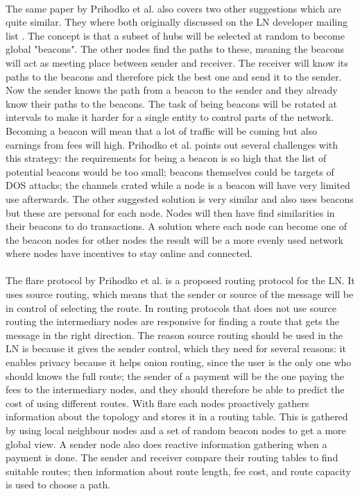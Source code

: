 \documentclass[informationsecurity]{gucmasterproject}
\begin{document}
\paragraph{}
The  same paper by Prihodko et al.\cite{prihodko2016flare} also covers two other suggestions which are quite similar.
They where both originally discussed on the LN developer mailing list\cite{rusty_routing1} \cite{rusty_routing2} \cite{rusty_routing3}. The concept is that a subset of hubs will be selected at random to become global "beacons". The other nodes find the paths to these, meaning the beacons will act as meeting place between sender and receiver. The receiver will know its paths to the beacons and therefore pick the best one and send it to the sender. Now the sender knows the path from a beacon to the sender and they already know their paths to the beacons. The task of being beacons will be rotated at intervals to make it harder for a single entity to control parts of the network. Becoming a beacon will mean that a lot of traffic will be coming but also earnings from fees will high.
Prihodko et al. points out several challenges with this strategy: the requirements for being a beacon is so high that the list of potential beacons would be too small; beacons themselves could be targets of DOS attacks; the channels crated while a node is a beacon will have very limited use afterwards. The other suggested solution is very similar and also uses beacons but these are personal for each node. Nodes will then have find similarities in their beacons to do transactions. A solution where each node can become one of the beacon nodes for other nodes the result will be a more evenly used network where nodes have incentives to stay online and connected.

\paragraph{}
The flare protocol by Prihodko et al.\cite{prihodko2016flare} is a proposed routing protocol for the LN. It uses source routing, which means that the sender or source of the message will be in control of selecting the route. In routing protocols that does not use source routing the intermediary nodes are responsive for finding a route that gets the message in the right direction. The reason source routing should be used in the LN is because it gives the sender control, which they need for several reasons\cite{prihodko2016flare}: it enables privacy because it helps onion routing, since the user is the only one who should knows the full route\cite{SB_onion}\cite{LN_onion_implementation}; the sender of a payment will be the one paying the fees to the intermediary nodes, and they should therefore be able to predict the cost of using different routes. With flare each nodes proactively gathers information about the topology and stores it in a routing table. This is gathered by using local neighbour nodes and a set of random beacon nodes to get a more global view. A sender node also does reactive information gathering when a payment is done. The sender and receiver compare their routing tables to find suitable routes; then information about route length, fee cost, and route capacity is used to choose a path. 
\end{document}
